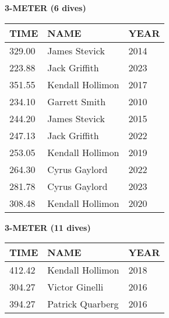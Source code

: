 \begin{center}
\begin{minipage}[t]{0.7\textwidth}
\centering
\textbf{3-METER (6 dives)}\\[0.05cm]
\begin{tabular}{@{}p{1.8cm}p{2.8cm}p{1.2cm}@{}}
\hline
\textbf{TIME} & \textbf{NAME} & \textbf{YEAR} \\
\hline
329.00 & James Stevick & 2014 \\
223.88 & Jack Griffith & 2023 \\
351.55 & Kendall Hollimon & 2017 \\
234.10 & Garrett Smith & 2010 \\
244.20 & James Stevick & 2015 \\
247.13 & Jack Griffith & 2022 \\
253.05 & Kendall Hollimon & 2019 \\
264.30 & Cyrus Gaylord & 2022 \\
281.78 & Cyrus Gaylord & 2023 \\
308.48 & Kendall Hollimon & 2020 \\
\hline
\end{tabular}
\end{minipage}
\end{center}

\vspace{0.4cm}

\begin{center}
\begin{minipage}[t]{0.7\textwidth}
\centering
\textbf{3-METER (11 dives)}\\[0.05cm]
\begin{tabular}{@{}p{1.8cm}p{2.8cm}p{1.2cm}@{}}
\hline
\textbf{TIME} & \textbf{NAME} & \textbf{YEAR} \\
\hline
412.42 & Kendall Hollimon & 2018 \\
304.27 & Victor Ginelli & 2016 \\
394.27 & Patrick Quarberg & 2016 \\
\hline
\end{tabular}
\end{minipage}
\end{center}

\vspace{0.4cm}


